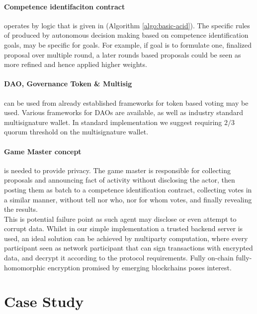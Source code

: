\documentclass{article}
\begin{document}
\begin{CJK}{UTF8}{gbsn}
\begin{multicols}{2}
            \paragraph{Competence identifaciton contract}
            operates by logic that is given in (Algorithm \ref{algo:basic-acid}). The specific rules of produced by autonomous decision making based on competence identification goals, may be specific for goals. For example, if goal is to formulate one, finalized proposal over multiple round, a later rounds based proposals could be seen as more refined and hence applied higher weights.


            \paragraph{DAO, Governance Token \& Multisig}
            can be used from already established frameworks for token based voting may be used. Various frameworks for DAOs are available\cite{AragonOSx}\cite{OpenZeppelinGovernor}, as well as industry standard multisignature wallet\cite{GnosisSafeMultisig}. In standard implementation we suggest requiring $2/3$ quorum threshold on the multisignature wallet.

        \paragraph{Game Master concept} is needed to provide privacy. The game master is responsible for collecting proposals and announcing fact of activity without disclosing the actor, then posting them as batch to a competence identification contract, collecting votes in a similar manner, without tell nor who, nor for whom votes, and finally revealing the results.\\ This is potential failure point as such agent may disclose or even attempt to corrupt data. Whilst in our simple implementation a trusted backend server is used, an ideal solution can be achieved by multiparty computation, where every participant seen as network participant that can sign transactions with encrypted data, and decrypt it according to the protocol requirements. Fully on-chain fully-homomorphic encryption promised by emerging blockchains poses interest\cite{Fhenix}.


        \section{Case Study}

\end{multicols}
\end{CJK}
\end{document}
